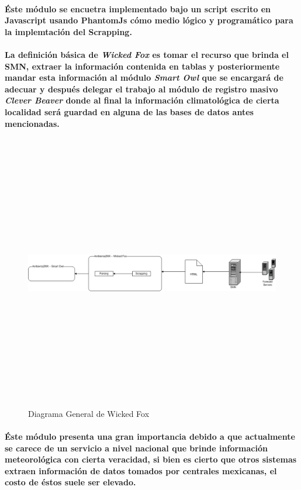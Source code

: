     \paragraph{Éste módulo se encuetra implementado bajo un script escrito en Javascript usando PhantomJs cómo medio lógico y programático para la implemtación del Scrapping.}
    \paragraph{ La definición básica de \textbf{\emph{Wicked Fox}} es tomar el recurso que brinda el SMN, extraer la información contenida en tablas y posteriormente mandar esta información al módulo \textbf{\emph{Smart Owl}} que se encargará de adecuar y después delegar el trabajo al módulo de registro masivo \textbf{\emph{Clever Beaver}} donde al final la información climatológica de cierta localidad será guardad en alguna de las bases de datos antes mencionadas.}
  	  \newpage
	  	\begin{landscape}
		  	\begin{figure}[h!]
		  	\centering
			  \includegraphics[width=22.5cm,height=12cm]{./images/DiagramaWickedFox.png}
			  \caption{Diagrama General de Wicked Fox}
			\end{figure}
	  	\end{landscape}
	  \newpage
    \paragraph{Éste módulo presenta una gran importancia debido a que actualmente se carece de un servicio a nivel nacional que brinde información meteorológica con cierta veracidad, si bien es cierto que otros sistemas extraen información de datos tomados por centrales mexicanas, el costo de éstos suele ser elevado.}
